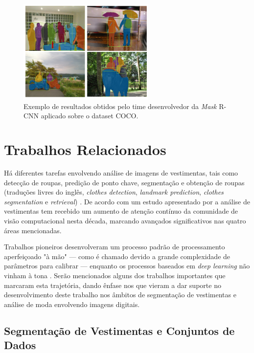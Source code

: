 \documentclass[12pt]{report}
\newcommand*{\captionsource}[2]{%
  \caption[{#1}]{%
    #1%
    \\\hspace{\linewidth}%
     \text{Fonte:}#2%
  }%
}
\begin{document}
\begin{figure}
    \centering
    \includegraphics[width=0.6\textwidth]{images/mask.png}
    \captionsource{Exemplo de resultados obtidos pelo time desenvolvedor da \textit{Mask} R-CNN aplicado sobre o dataset COCO.}{ \protect\cite{maskrcnn}}
    \label{fig:mask}
\end{figure}

\chapter{Trabalhos Relacionados}
\label{cha:relacionados}

Há diferentes tarefas envolvendo análise de imagens de vestimentas, tais como detecção de roupas, predição de ponto chave, segmentação e obtenção de roupas (traduções livres do inglês, \textit{clothes detection}, \textit{landmark prediction}, \textit{clothes segmentation} e \textit{retrieval}) \cite{deepfashion2}. De acordo com um estudo apresentado por \cite{jia} a análise de vestimentas tem recebido um aumento de atenção contínuo da comunidade de visão computacional nesta década, marcando avançados significativos nas quatro áreas mencionadas.

Trabalhos pioneiros desenvolveram um processo padrão de processamento aperfeiçoado "à mão"  --- como é chamado devido a grande complexidade de parâmetros para calibrar --- enquanto os processos baseados em \textit{deep learning} não vinham à tona \cite{deephuman}. Serão mencionados alguns dos trabalhos importantes que marcaram esta trajetória, dando ênfase nos que vieram a dar suporte no desenvolvimento deste trabalho nos âmbitos de segmentação de vestimentas e análise de moda envolvendo imagens digitais. 

\section{Segmentação de Vestimentas e Conjuntos de Dados}
\end{document}

